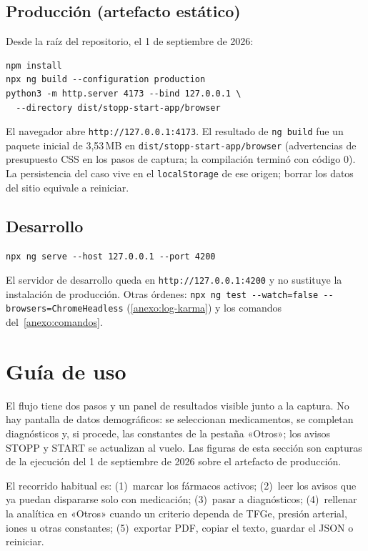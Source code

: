 \subsection{Producción (artefacto estático)}
\label{sec:instalacion-produccion}

Desde la raíz del repositorio, el 1 de septiembre de 2026:

\begin{lstlisting}[numbers=none]
npm install
npx ng build --configuration production
python3 -m http.server 4173 --bind 127.0.0.1 \
  --directory dist/stopp-start-app/browser
\end{lstlisting}

El navegador abre \texttt{http://127.0.0.1:4173}. El resultado de
\texttt{ng build} fue un paquete inicial de 3,53\,MB en
\texttt{dist/stopp-start-app/browser} (advertencias de presupuesto CSS
en los pasos de captura; la compilación terminó con código 0). La
persistencia del caso vive en el \texttt{localStorage} de ese origen;
borrar los datos del sitio equivale a reiniciar.

\subsection{Desarrollo}

\begin{lstlisting}[numbers=none]
npx ng serve --host 127.0.0.1 --port 4200
\end{lstlisting}

El servidor de desarrollo queda en \texttt{http://127.0.0.1:4200} y no
sustituye la instalación de producción. Otras órdenes:
\texttt{npx ng test -{}-watch=false -{}-browsers=ChromeHeadless}
(\cref{anexo:log-karma}) y los comandos del~\cref{anexo:comandos}.

\section{Guía de uso}

El flujo tiene dos pasos y un panel de resultados visible junto a la
captura. No hay pantalla de datos demográficos: se seleccionan
medicamentos, se completan diagnósticos y, si procede, las constantes de
la pestaña «Otros»; los avisos STOPP y START se actualizan al vuelo. Las
figuras de esta sección son capturas de la
ejecución del 1 de septiembre de 2026 sobre el artefacto de producción.

El recorrido habitual es: (1)~marcar los fármacos activos; (2)~leer los
avisos que ya puedan dispararse solo con medicación; (3)~pasar a
diagnósticos; (4)~rellenar la analítica en «Otros» cuando un criterio
dependa de TFGe, presión arterial, iones u otras constantes; (5)~exportar
PDF, copiar el texto, guardar el JSON o reiniciar.

